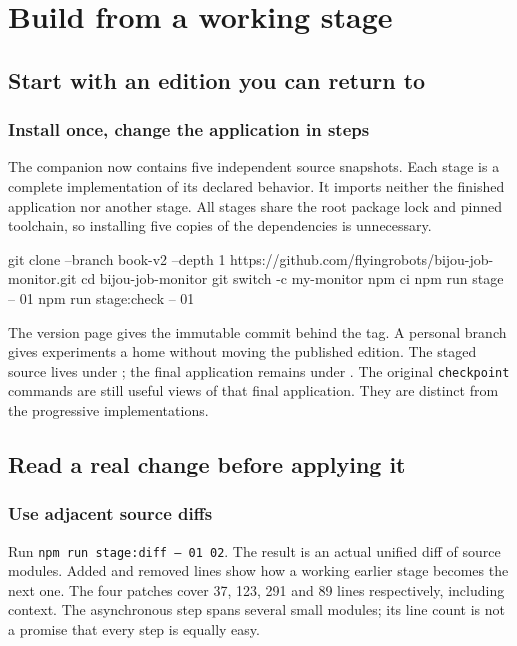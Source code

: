 \chapter{Build from a working stage}\label{teaching-build-along}

\section{Start with an edition you can return to}
\subsection{Install once, change the application in steps}

The companion now contains five independent source snapshots. Each stage is a complete implementation of its declared behavior. It imports neither the finished  application nor another stage. All stages share the root package lock and pinned toolchain, so installing five copies of the dependencies is unnecessary.

\begin{CodeBlock}
git clone --branch book-v2 --depth 1 https://github.com/flyingrobots/bijou-job-monitor.git
cd bijou-job-monitor
git switch -c my-monitor
npm ci
npm run stage -- 01
npm run stage:check -- 01
\end{CodeBlock}

The version page gives the immutable commit behind the tag. A personal branch gives experiments a home without moving the published edition. The staged source lives under ; the final application remains under . The original \texttt{checkpoint} commands are still useful views of that final application. They are distinct from the progressive implementations.



\section{Read a real change before applying it}
\subsection{Use adjacent source diffs}

Run \texttt{npm run stage:diff -- 01 02}. The result is an actual unified diff of source modules. Added and removed lines show how a working earlier stage becomes the next one. The four patches cover 37, 123, 291 and 89 lines respectively, including context. The asynchronous step spans several small modules; its line count is not a promise that every step is equally easy.


